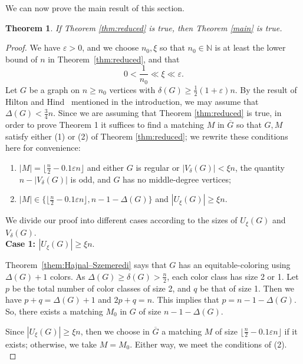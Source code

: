 \documentclass[11pt, oneside]{article}
\newcommand{\ve}{\varepsilon}
\newtheorem{theorem}{Theorem}
\begin{document}
We can now prove the main result of this section.\\

\begin{theorem} If Theorem \ref{thm:reduced} is true, then Theorem \ref{main} is true.
\end{theorem}


\begin{proof} We have $\varepsilon>0$, and we choose  
$n_0,\xi$  so that 
$n_0\in \mathbb{N}$ is at least the lower bound of $n$ in Theorem~\ref{thm:reduced}, 
and that 
\begin{equation}\label{eqn:parameters}
	0< \frac{1}{n_0 }   \ll  \xi  \ll \ve.    
\end{equation}
Let $G$ be a graph on $n\ge n_0$ vertices with $\delta(G) \ge \frac{1}{2}(1+\varepsilon)n$. By the result of Hilton and Hind~\cite{MR1226136} mentioned in the introduction,  we may assume that $\Delta(G)< \frac{3}{4} n$. Since we are assuming that Theorem \ref{thm:reduced} is true, in order to prove Theorem 1 it suffices to find a matching $M$ in $\overline{G}$ so that $G, M$ satisfy
either (1) or (2) of Theorem \ref{thm:reduced}; we rewrite these conditions here for convenience:
\begin{enumerate}[(1)]
        \item $|M|=\lfloor \frac{n}{2} - 0.1 \ve n \rfloor$ and either $G$ is regular or $|V_\delta(G)|<\xi n$, the quantity $n-|V_\delta(G)|$ is odd, and $G$ has no middle-degree vertices;
  \item $|M|\in\{\lfloor \frac{n}{2} - 0.1 \ve n \rfloor, n-1-\Delta(G) \}$ and $|U_\xi(G)| \ge \xi n$.
    \end{enumerate}
We divide our proof into different cases according to the sizes of $U_\xi(G)$ and $V_\delta(G)$.\\

\noindent \textbf{Case 1: $|U_\xi(G)| \geq \xi n$}.  

Theorem~\ref{them:Hajnal–Szemeredi} says that $G$ has an equitable-coloring using $\Delta(G)+1$ colors. As $\Delta(G)\geq \delta(G)>\frac{n}{2}$, each color class has size 2 or 1. Let $p$ be the total number of color classes of size 2, and $q$ be that of size 1. Then we have $p+q=\Delta(G)+1$ and $2p+q =n$. This implies that $p=n-1-\Delta(G)$. So, there exists a matching $M_0$ in $G$ of size $n-1-\Delta(G)$.  

Since $|U_\xi(G)| \ge \xi n$, then we choose in $\overline{G}$ a matching $M$ of size $\lfloor \frac{n}{2} - 0.1 \ve n \rfloor$ if it exists; otherwise, we take $M=M_0$. Either way, we meet the conditions of (2).\\



\end{proof}
\end{document}
